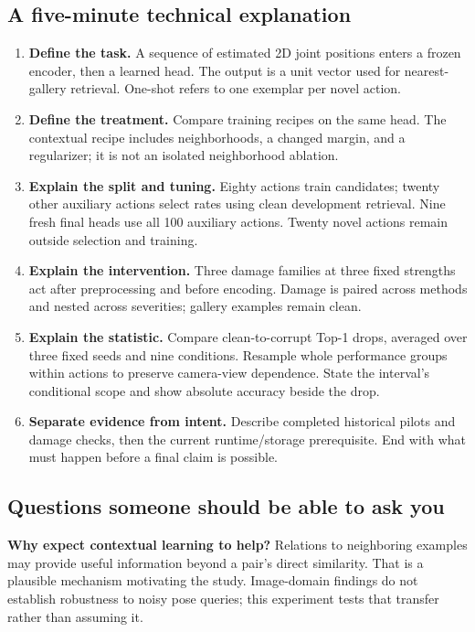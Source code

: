 \subsection{A five-minute technical explanation}
\begin{enumerate}
\item \textbf{Define the task.} A sequence of estimated 2D joint positions enters
a frozen encoder, then a learned head. The output is a unit vector used for
nearest-gallery retrieval. One-shot refers to one exemplar per novel action.
\item \textbf{Define the treatment.} Compare training recipes on the same head.
The contextual recipe includes neighborhoods, a changed margin, and a regularizer;
it is not an isolated neighborhood ablation.
\item \textbf{Explain the split and tuning.} Eighty actions train candidates;
twenty other auxiliary actions select rates using clean development retrieval.
Nine fresh final heads use all 100 auxiliary actions. Twenty novel actions
remain outside selection and training.
\item \textbf{Explain the intervention.} Three damage families at three fixed
strengths act after preprocessing and before encoding. Damage is paired across
methods and nested across severities; gallery examples remain clean.
\item \textbf{Explain the statistic.} Compare clean-to-corrupt Top-1 drops,
averaged over three fixed seeds and nine conditions. Resample whole performance
groups within actions to preserve camera-view dependence. State the interval's
conditional scope and show absolute accuracy beside the drop.
\item \textbf{Separate evidence from intent.} Describe completed historical
pilots and damage checks, then the current runtime/storage prerequisite. End
with what must happen before a final claim is possible.
\end{enumerate}

\subsection{Questions someone should be able to ask you}
\textbf{Why expect contextual learning to help?}
Relations to neighboring examples may provide useful information beyond a
pair's direct similarity. That is a plausible mechanism motivating the study.
Image-domain findings do not establish robustness to noisy pose queries; this
experiment tests that transfer rather than assuming it.

